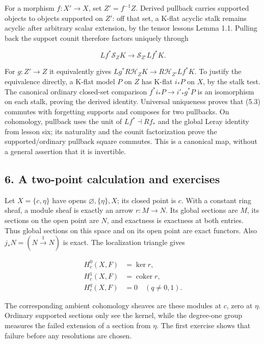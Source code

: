\documentclass[
  english,
  11pt,
  a4paper,
]{article}
\begin{document}
For a morphism \(f:X'\to X\), set \(Z'=f^{-1}Z\). Derived pullback
carries supported objects to objects supported on \(Z'\): off that set,
a K-flat acyclic stalk remains acyclic after arbitrary scalar extension,
by the tensor lesson\textquotesingle s Lemma 1.1. Pulling back the
support counit therefore factors uniquely through

\[Lf^*\mathcal S_ZK\longrightarrow\mathcal S_{Z'}Lf^*K.
\tag{5.3}\]

For \(g:Z'\to Z\) it equivalently gives
\(Lg^*R\mathcal H_ZK\to R\mathcal H_{Z'}Lf^*K\). To justify the
equivalence directly, a K-flat model \(P\) on \(Z\) has K-flat \(i_*P\)
on \(X\), by the stalk test. The canonical ordinary closed-set
comparison \(f^*i_*P\to i'_*g^*P\) is an isomorphism on each stalk,
proving the derived identity. Universal uniqueness proves that (5.3)
commutes with forgetting supports and composes for two pullbacks. On
cohomology, pullback uses the unit of \(Lf^*\dashv Rf_*\) and the global
Leray identity from lesson six; its naturality and the counit
factorization prove the supported/ordinary pullback square commutes.
This is a canonical map, without a general assertion that it is
invertible.

\subsection{6. A two-point calculation and
exercises}\label{sections-with-support-and-the-localization-triangle--6-a-two-point-calculation-and-exercises}

Let \(X=\{c,\eta\}\) have opens \(\varnothing,\{\eta\},X\); its closed
point is \(c\). With a constant ring sheaf, a module sheaf is exactly an
arrow \(r:M\to N\). Its global sections are \(M\), its sections on the
open point are \(N\), and exactness is exactness at both entries. Thus
global sections on this space and on its open point are exact functors.
Also \(j_*N=(N\xrightarrow{1}N)\) is exact. The localization triangle
gives

\[\begin{aligned}
H^0_c(X,F)&=\ker r,\\
H^1_c(X,F)&=\operatorname{coker}r,\\
H^q_c(X,F)&=0\quad(q\ne0,1).
\end{aligned}
\tag{6.1}\]

The corresponding ambient cohomology sheaves are these modules at \(c\),
zero at \(\eta\). Ordinary supported sections only see the kernel, while
the degree-one group measures the failed extension of a section from
\(\eta\). The first exercise shows that failure before any resolutions
are chosen.
\end{document}
